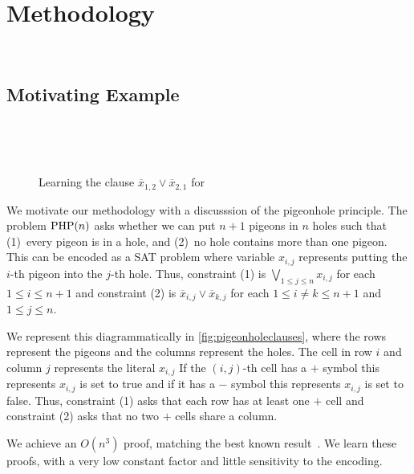 \section{Methodology}~\label{sec:method}

\subsection{Motivating Example}~\label{sec:motivatex}

\begin{figure*}[!t]
    \centering
    
    \caption{Learning the clause $\overline{x}_{1, 2} \lor \overline{x}_{2, 1}$ for }~\label{fig:pigeonholeclauses}
  \end{figure*}

We motivate our methodology with a discusssion of the pigeonhole principle.
The problem $\mathrm{PHP}(n)$ asks whether we can put $n+1$ pigeons in $n$ holes such
that (1)~every pigeon is in a hole, and (2)~no hole contains more than one
pigeon. This can be encoded as a SAT problem where variable $x_{i, j}$
represents putting the $i$-th pigeon into the $j$-th hole. Thus, constraint (1)
is $\bigvee_{1 \leq j \leq n} x_{i, j}$ for each $1 \leq i \leq n+1$ and
constraint (2) is $\overline{x}_{i, j} \lor \overline{x}_{k, j}$ for each $ 1
\leq i \neq k \leq n+1$ and $1 \leq j \leq n$.

We represent this diagrammatically in \autoref{fig:pigeonholeclauses}, where the
rows represent the pigeons and the columns represent the holes. The cell in row
$i$ and column $j$ represents the literal $x_{i, j}$
If the $(i, j)$-th cell has a $+$ symbol this represents $x_{i, j}$ is set to
true and if it has a $-$ symbol this represents $x_{i, j}$ is set to false.
Thus, constraint (1) asks that each row has at least one $+$ cell and
constraint (2) asks that no two $+$ cells share a column.

We achieve an $O(n^3)$ \pr proof, matching the best known
result~\cite{prclauses}. We learn these proofs, with a very low constant
factor and little sensitivity to the encoding.



